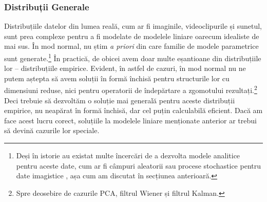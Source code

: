 \documentclass[../../book-main_ro.tex]{subfiles}
\begin{document}
\subsubsection{Distribuții Generale}\label{sec:denoising-intro}

Distribuțiile datelor din lumea reală, cum ar fi imaginile, videoclipurile și sunetul, sunt prea complexe pentru a fi modelate de modelele liniare oarecum idealiste de mai sus. În mod normal, nu știm {\em a priori} din care familie de modele parametrice sunt generate.\footnote{Deși în istorie au existat multe încercări de a dezvolta modele analitice pentru aceste date, cum ar fi câmpuri aleatorii sau procese stochastice pentru date imagistice \cite{Mumford-1999}, așa cum am discutat în secțiunea anterioară.} În practică, de obicei avem doar multe eșantioane din distribuțiile lor -- distribuțiile empirice. Evident, în astfel de cazuri, în mod normal nu ne putem aștepta să avem soluții în formă închisă pentru structurile lor cu dimensiuni reduse, nici pentru operatorii de îndepărtare a zgomotului rezultați.\footnote{Spre deosebire de cazurile PCA, filtrul Wiener și filtrul Kalman.} Deci trebuie să dezvoltăm o soluție mai generală pentru aceste distribuții empirice, nu neapărat în formă închisă, dar cel puțin calculabilă eficient. Dacă am face acest lucru corect, soluțiile la modelele liniare menționate anterior ar trebui să devină cazurile lor speciale.
\end{document}
